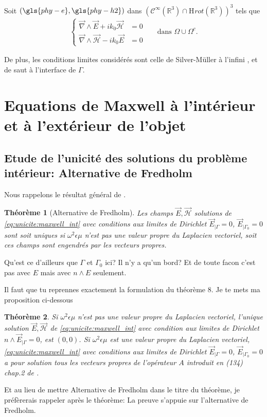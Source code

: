 \documentclass[12pt,%
    twoside,%
    a4paper,%
    openright, %
    ]{book}
\numberwithin{equation}{section} %
\newtheorem{thm}{Théorème}[chapter] %
\newcommand{\pvect}{\wedge}
\newcommand{\vect}[1]{{\overset{\rightarrow}{#1}}}
\newcommand{\w}{\omega}
\newcommand{\RR}{\mathbb R}
\newcommand{\eps}{\epsilon}
\newcommand{\OO}{\Omega}
\newcommand{\Sobup}[1][{}]{\mathrm{H}^\mathrm{#1}}
\newcommand{\Sobolev}[1][{}]{\Sobup{#1}}
\newcommand{\vE}{\vect{E}}
\newcommand{\cH}{\mathcal{H}}
\newcommand{\vH}{\vect{\cH}}
\newcommand{\vrot}{\vect{\nabla}\pvect}
\newcounter{REM}
\newenvironment{REM}[1][\theREM]
    {%
        \stepcounter{REM}
        \hypertarget{REM#1}{}%
        \pdfbookmark[0]{REM \theREM}{REM#1}
        \begin{tcolorbox}[%
                title={Remarque \theREM},%
                colback=red!30!white,%
                colframe=red!75!black,%
            ]
    }
    {
        \end{tcolorbox}%
    }%
\begin{document}
Soit \((\gls{phy-e},\gls{phy-h2})\) dans \((\mathcal{C}^\infty(\RR^3)\cap\Sobolev[rot](\RR^3))^3\) tels que
\begin{align}
\left\lbrace
\begin{matrix}
    \vrot \vE + i k_0 \vH &= 0
    \\
    \vrot \vH - i k_0 \vE &= 0
\end{matrix}
\right. && \text{dans \(\OO\cup\OO^c\).}
\label{eq:unicite:maxwell_ext}
\end{align}

De plus, les conditions limites considérés sont celle de Silver-Müller à l'infini \cite[eq (43), p.~78]{cessenat_mathematical_1996}, et de saut à l'interface de \(\Gamma\).

\section{Equations de Maxwell à l'intérieur et à l'extérieur de l'objet}

    \subsection{Etude de l'unicité des solutions du problème intérieur: Alternative de Fredholm}

        Nous rappelons le résultat général de \cite[Théorème~8, p.~111]{cessenat_mathematical_1996}.
        \begin{thm}[Alternative de Fredholm]
            Les champs \(\vE,\vH\) solutions de \eqref{eq:unicite:maxwell_int} avec conditions aux limites de Dirichlet \(\vE_{|\Gamma} = 0\), \(\vE_{|\Gamma_0} = 0\) sont soit uniques si \(\w^2\eps\mu\) n'est pas une valeur propre du Laplacien vectoriel, soit ces champs sont engendrés par les vecteurs propres.
        \end{thm}
        \begin{REM}
        Qu'est ce d'ailleurs que $\Gamma$ et $\Gamma_0$ ici? Il n'y a qu'un bord? Et de toute facon c'est pas avec $E$ mais avec $n\wedge E$ seulement.
        
        Il faut que tu reprennes exactement la formulation du théorème 8. Je te mets ma proposition ci-dessous
        \begin{thm}
        Si \(\w^2\eps\mu\) n'est pas une valeur propre du Laplacien vectoriel, l'unique solution \(\vE,\vH\) de \eqref{eq:unicite:maxwell_int} avec condition aux limites de Dirichlet \(n\wedge \vE_{|\Gamma} = 0\),  est $(0,0)$. Si \(\w^2\eps\mu\) est une valeur propre du Laplacien vectoriel, \eqref{eq:unicite:maxwell_int} avec conditions aux limites de Dirichlet \(\vE_{|\Gamma} = 0\), \(\vE_{|\Gamma_0} = 0\) a pour solution tous les vecteurs propres de  l'opérateur $A$ introduit en (134) chap.2 de   \cite[Théorème~8, p.~111]{cessenat_mathematical_1996}.   \end{thm}
        
        
        Et au lieu de mettre Alternative de Fredholm dans le titre du théorème, je préfèrerais rappeler après le théorème: La preuve s'appuie sur l'alternative de Fredholm.
        \end{REM}
\end{document}
